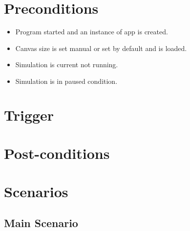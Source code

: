 \documentclass[notitlepage]{article}
\begin{document}
\begin{comment}
	{\noindent Switching between three stored rules.}
\end{comment}


\section{Preconditions}

\begin{itemize}
	\item Program started and an instance of app is created.
	\item Canvas size is set manual or set by default and is loaded.
	\item Simulation is current not running.
	\item Simulation is in paused condition.
\end{itemize}

\section{Trigger}\label{sec:trigger}

\begin{comment}
     \noindent Click on rule selection menu.
\end{comment}

\section{Post-conditions}\label{sec:postconditions}

\begin{comment}
     \noindent Simulation rule will be set as desire.
\end{comment}

\section{Scenarios}\label{sec:scenarios}

\subsection{Main Scenario}\label{subsec:main:scenario}

\begin{comment}
	\begin{itemize}
  		\item Rule number is set to 0, 1 or 2.
  		\item Start pattern is send to frame collection ready for new simulation.
	\end{itemize}
\end{comment}
\end{document}

